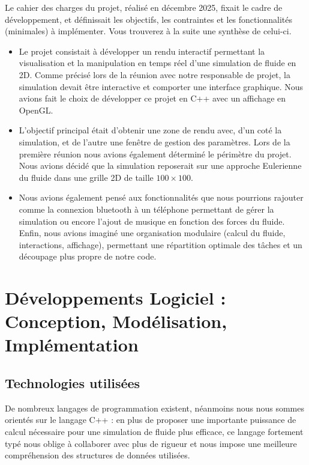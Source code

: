 \documentclass[a4paper]{article}
\begin{document}
    Le cahier des charges du projet, réalisé en décembre 2025, fixait le cadre de développement, et définissait les objectifs, les contraintes et les fonctionnalités (minimales) à implémenter. Vous trouverez à la suite une synthèse de celui-ci.
\begin{itemize}
        \item Le projet consistait à développer un rendu interactif permettant la visualisation et la manipulation en temps réel d'une simulation de fluide en 2D. Comme précisé lors de la réunion avec notre responsable de projet, la simulation devait être interactive et comporter une interface graphique. Nous avions fait le choix de développer ce projet en C++ avec un affichage en OpenGL.
        \item L'objectif principal était d'obtenir une zone de rendu avec, d'un coté la simulation, et de l'autre une fenêtre de gestion des paramètres. Lors de la première réunion nous avions également déterminé le périmètre du projet. Nous avions décidé que la simulation reposerait sur une approche Eulerienne du fluide dans une grille 2D de taille $100 \times 100$.
        \item Nous avions également pensé aux fonctionnalités que nous pourrions rajouter comme la connexion bluetooth à un téléphone permettant de gérer la simulation ou encore l'ajout de musique en fonction des forces du fluide. Enfin, nous avions imaginé une organisation modulaire (calcul du fluide, interactions, affichage), permettant une répartition optimale des tâches et un découpage plus propre de notre code. 
\end{itemize}





\section{Développements Logiciel : Conception, Modélisation, Implémentation}
\subsection{Technologies utilisées}


\hspace*{\parindent} De nombreux langages de programmation existent, néanmoins nous nous sommes orientés sur le langage C++ : en plus de proposer une importante puissance de calcul nécessaire pour une simulation de fluide plus efficace, ce langage fortement typé nous oblige à collaborer avec plus de rigueur et nous impose une meilleure compréhension des structures de données utilisées.\\
\end{document}
